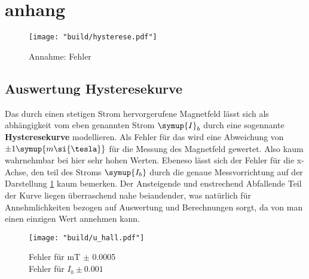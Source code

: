 \section{anhang}

\begin{figure}
    \centering
    \texttt{[image: "build/hysterese.pdf"]}
    \label{fig:Bfeld}
    \caption{Annahme: Fehler }
 \end{figure}

 \subsection{Auswertung Hysteresekurve}
 Das durch einen stetigen Strom hervorgerufene Magnetfeld lässt sich als abhängigkeit vom eben genannten Strom $\symup{I}_b$ durch eine sogennante \textbf{Hysteresekurve} modellieren.
 Als Fehler für das wird eine Abweichung von $\pm 1 \symup{m\si{\tesla}}$ für die Messung des Magnetfeld gewertet. Also kaum wahrnehmbar bei hier sehr hohen Werten. Ebeneso lässt sich der Fehler für die x-Achse, den teil des Stroms 
 $\symup{I_b}$ durch die genaue Messvorrichtung auf der Darstellung \ref{fig:Bfeld} kaum bemerken.
 Der Ansteigende und enstrechend Abfallende Teil der Kurve liegen überraschend nahe beiandender, was natürlich für Annehmlichkeiten bezogen auf Auswertung und Berechnungen sorgt, da von man einen einzigen Wert annehmen kann.
 
 
\begin{figure}
   \centering
    \texttt{[image: "build/u\_hall.pdf"]}
    \label{fig:Uhall}
    \caption{Fehler für mT $\pm$ 0.0005\\Fehler für $I_b \pm 0.001$}
 \end{figure}